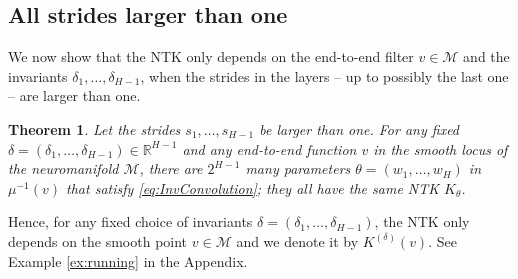 \documentclass[twoside]{article}
\newtheorem{theorem}{Theorem}
\theoremstyle{definition}
\theoremstyle{remark}
\begin{document}
\subsection{All strides larger than one}
    We now show that the NTK only depends on the end-to-end filter $v \in \mathcal{M}$ and the invariants $\delta_1, \ldots, \delta_{H-1}$, when the strides in the layers -- up to possibly the last one -- are larger than one.
\begin{theorem}\label{thm:mainStrideLargerOne}
    Let the strides $s_1, \ldots, s_{H-1}$ be larger than one.
    For any fixed   $\delta = (\delta_1, \ldots, \delta_{H-1}) \in \mathbb{R}^{H-1}$ and any end-to-end function $v$ in the smooth locus of the neuromanifold $\mathcal{M}$, there are $2^{H-1}$ many parameters $\theta = (w_1, \ldots, w_H)$ in $\mu^{-1}(v)$ that satisfy \eqref{eq:InvConvolution}; they all have the same NTK $K_\theta$.  
\end{theorem}

Hence, for any fixed choice of invariants $\delta = (\delta_1, \ldots, \delta_{H-1})$, 
the NTK only depends on the smooth point $v \in \mathcal{M}$ and we denote it by $K^{(\delta)}(v)$. See Example \ref{ex:running} in the Appendix.
\end{document}
